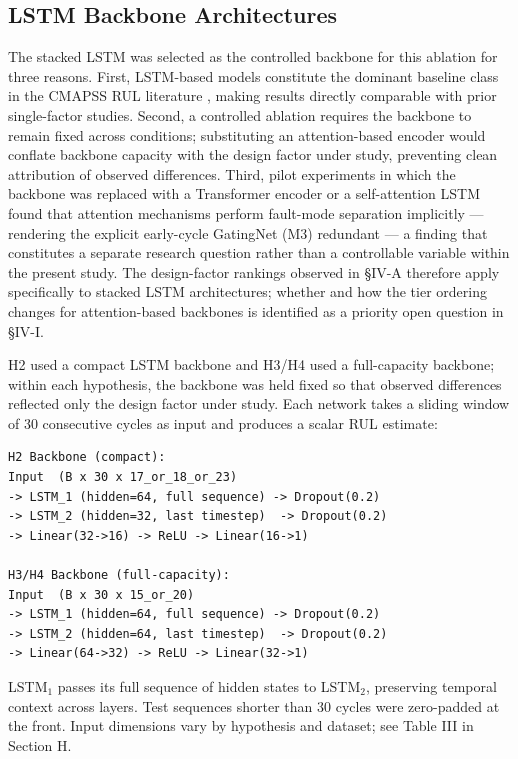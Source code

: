 \documentclass[review,12pt]{elsarticle}
\begin{document}
\subsection{LSTM Backbone Architectures}

The stacked LSTM was selected as the controlled backbone for this ablation for three reasons. First, LSTM-based models constitute the dominant baseline class in the CMAPSS RUL literature \cite{ref05,ref06,ref09}, making results directly comparable with prior single-factor studies. Second, a controlled ablation requires the backbone to remain fixed across conditions; substituting an attention-based encoder would conflate backbone capacity with the design factor under study, preventing clean attribution of observed differences. Third, pilot experiments in which the backbone was replaced with a Transformer encoder or a self-attention LSTM found that attention mechanisms perform fault-mode separation implicitly --- rendering the explicit early-cycle GatingNet (M3) redundant --- a finding that constitutes a separate research question rather than a controllable variable within the present study. The design-factor rankings observed in \S{}IV-A therefore apply specifically to stacked LSTM architectures; whether and how the tier ordering changes for attention-based backbones is identified as a priority open question in \S{}IV-I.

H2 used a compact LSTM backbone and H3/H4 used a full-capacity backbone; within each hypothesis, the backbone was held fixed so that observed differences reflected only the design factor under study. Each network takes a sliding window of 30 consecutive cycles as input and produces a scalar RUL estimate:
{\small\begin{verbatim}
H2 Backbone (compact):
Input  (B x 30 x 17_or_18_or_23)
-> LSTM_1 (hidden=64, full sequence) -> Dropout(0.2)
-> LSTM_2 (hidden=32, last timestep)  -> Dropout(0.2)
-> Linear(32->16) -> ReLU -> Linear(16->1)

H3/H4 Backbone (full-capacity):
Input  (B x 30 x 15_or_20)
-> LSTM_1 (hidden=64, full sequence) -> Dropout(0.2)
-> LSTM_2 (hidden=64, last timestep)  -> Dropout(0.2)
-> Linear(64->32) -> ReLU -> Linear(32->1)
\end{verbatim}
}

LSTM$_1$ passes its full sequence of hidden states to LSTM$_2$, preserving temporal context across layers. Test sequences shorter than 30 cycles were zero-padded at the front. Input dimensions vary by hypothesis and dataset; see Table III in Section H.
\end{document}
